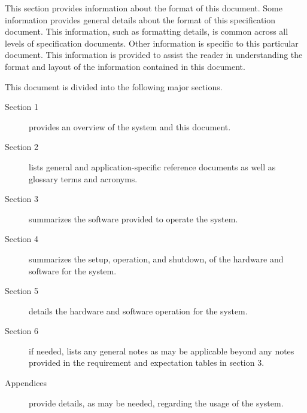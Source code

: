 
This section provides information about the format of this document.
Some information provides general details about the format of this specification document.
This information, such as formatting details, is common across all levels of specification documents.
Other information is specific to this particular document.
This information is provided to assist the reader in understanding the format and layout of the information contained in this document.

This document is divided into the following major sections.
\begin{description}
	\item[Section 1] provides an overview of the system and this document.
	\item[Section 2] lists general and application-specific reference documents as well as glossary terms and acronyms. 
	\item[Section 3] summarizes the software provided to operate the system.
	\item[Section 4] summarizes the setup, operation, and shutdown, of the hardware and software for the system.
	\item[Section 5] details the hardware and software operation for the system.
	\item[Section 6] if needed, lists any general notes as may be applicable beyond any notes provided in the requirement and expectation tables in section 3.
	\item[Appendices] provide details, as may be needed, regarding the usage of the system.
\end{description}